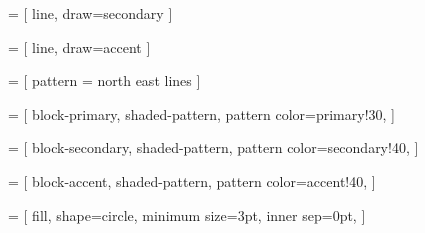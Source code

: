  = [
     line,
     draw=secondary
]


 = [
     line,
     draw=accent
]


 = [
    pattern = north east lines
]

 = [
    block-primary,
    shaded-pattern,
    pattern color=primary!30,
]

 = [
    block-secondary,
    shaded-pattern,
    pattern color=secondary!40,
]

 = [
    block-accent,
    shaded-pattern,
    pattern color=accent!40,
]


 = [
    fill,
    shape=circle,
    minimum size=3pt,
    inner sep=0pt,
]
